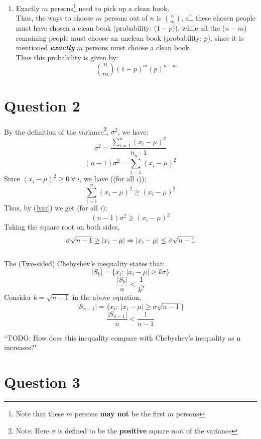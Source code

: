 \documentclass[11pt]{article}
\begin{document}
\begin{enumerate}[label=(\alph*)]
    \item Exactly $m$ persons\footnote{Note that these $m$ persons \textbf{may not} be the first $m$ persons} need to pick up a clean book.\\
    Thus, the ways to choose $m$ persons out of $n$ is ${n\choose m}$, all these chosen people must have chosen a clean book (probability: ($1-p$)), while all the ($ n-m $) remaining people must choose an unclean book (probability: $p$), since it is mentioned \textbf{\textit{exactly}} $m$ persons must choose a clean book.\\
    Thus this probability is given by:
    $$ {n\choose m} (1-p)^m (p)^{n-m} $$
    
\end{enumerate}

\newpage
\section{Question 2}
By the definition of the variance\footnote{Note: Here $\sigma$ is defined to be the \textbf{positive} square root of the variance}, $\sigma^2$, we have:
$$ \sigma^2 = \frac{\sum_{i=1}^n (x_i - \mu)^2}{n-1} $$
\begin{equation}
    \label{var}
    (n-1)\sigma^2 = \sum_{i=1}^n (x_i - \mu)^2
\end{equation}
Since $(x_i - \mu)^2 \ge 0 \  \forall \ i$, we have ((for all $i$)):
$$ \sum_{i=1}^n (x_i - \mu)^2 \ge (x_i - \mu)^2  $$
Thus, by (\ref{var}) we get (for all $i$):
$$ (n-1)\sigma^2 \ge (x_i - \mu)^2 $$
Taking the square root on both sides,
$$ \sigma\sqrt{n-1} \ge |x_i - \mu| \Rightarrow |x_i - \mu| \le \sigma\sqrt{n-1} \hfill $$
\hfill \qedsymbol \\
\noindent
The (Two-sided) Chebyshev's inequality states that:
$$ |S_k| = \{ x_i : \  |x_i - \mu| \ge k\sigma \} $$
\begin{equation}
    \frac{|S_k|}{n} < \frac{1}{k^2}
\end{equation}
Consider $k = \sqrt{n-1}$ in the above equation,\\
$$ |S_{n-1}| = \{ x_i : \  |x_i - \mu| \ge \sigma\sqrt{n-1} \} $$
$$ \frac{|S_{n-1}|}{n} < \frac{1}{n-1} $$

``TODO: How does this inequality compare with Chebyshev's inequality as n increases?"

\newpage
\section{Question 3}
\end{document}
